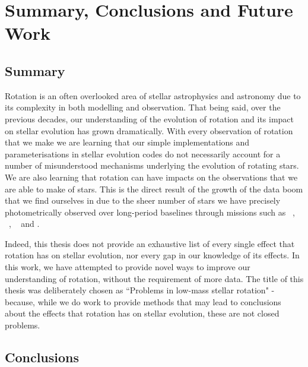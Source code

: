 \newcommand\wfirst{\project{WFIRST}}
\newcommand\plato{\project{PLATO}}
\newcommand\haydn{\project{HAYDN}}


 
\chapter{Summary, Conclusions and Future Work}
\label{chap:conc}

\section{Summary}

Rotation is an often overlooked area of stellar astrophysics and astronomy due to its complexity in both modelling and observation.
That being said, over the previous decades, our understanding of the evolution of rotation and its impact on stellar evolution has grown dramatically.
With every observation of rotation that we make we are learning that our simple implementations and parameterisations in stellar evolution codes do not necessarily account for a number of misunderstood mechanisms underlying the evolution of rotating stars.
We are also learning that rotation can have impacts on the observations that we are able to make of stars.
This is the direct result of the growth of the data boom that we find ourselves in due to the sheer number of stars we have precisely photometrically observed over long-period baselines through missions such as \kepler\ \citep{borucki_kepler_2010}, \ktoo\ \citep{howell_k2_2014}, \tess\ \citep{ricker_transiting_2014} and \gaia{} \citep{distefano_gaia_2022} .

Indeed, this thesis does not provide an exhaustive list of every single effect that rotation has on stellar evolution, nor every gap in our knowledge of its effects.
In this work, we have attempted to provide novel ways to improve our understanding of rotation, without the requirement of more data.
The title of this thesis was deliberately chosen as ``Problems in low-mass stellar rotation" - because, while we do work to provide methods that may lead to conclusions about the effects that rotation has on stellar evolution, these are not closed problems.

\section{Conclusions}

